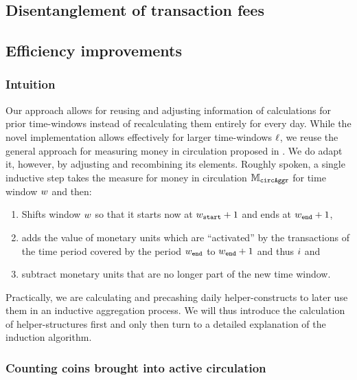 \subsection{Disentanglement of  transaction fees}
\label{sec:improve_fees}%


\subsection{Efficiency improvements}
\label{sec:novel_impl}%

\subsubsection{Intuition}
Our approach allows for reusing and adjusting information of calculations for prior time-windows instead of recalculating them entirely for every day. %
While the novel implementation allows effectively for larger time-windows \({\ell}\), we reuse the general approach for measuring money in circulation proposed in \cite{pernice2019cryptocurrencies}. %
We do adapt it, however, by adjusting and recombining its elements. %
Roughly spoken, a single inductive step takes the measure for money in circulation \( {\mathbb{M}_{\mathtt{circAggr}}} \) for time window \({w}\) and then: %
\begin{enumerate}
\item Shifts window \({w}\) so that it starts now at \({w}_{{\mathtt{start}}} + 1\) and ends at \({w}_{{\mathtt{end}}} + 1\),
\item adds the value of monetary units which are ``activated'' by the transactions of the time period covered by the period \({w}_{{\mathtt{end}}}\) to \({w}_{{\mathtt{end}}} + 1\) and thus \({i}\) and %
\item subtract monetary units that are no longer part of the new time window. %
\end{enumerate}
Practically, we are calculating and precashing daily helper-constructs to later use them in an inductive aggregation process. %
We will thus introduce the calculation of helper-structures first and only then turn to a detailed explanation of the induction algorithm. %

\subsubsection{Counting coins brought into active circulation}

